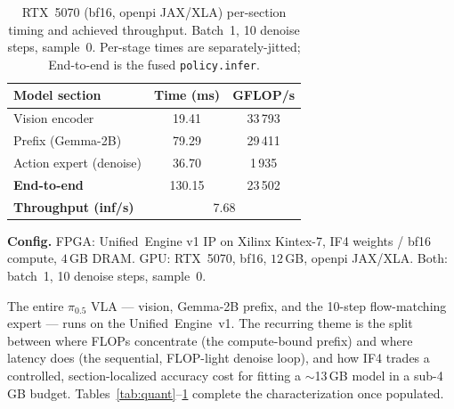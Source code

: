 \documentclass[11pt]{article}
\newcommand{\pizero}{$\pi_{0.5}$}
\newcommand{\ue}{Unified~Engine}
\newcommand{\iffour}{IF4}
\newcommand{\bfteen}{bf16}
\begin{document}
\begin{table}[t]
\centering\small
\caption{RTX~5070 (\bfteen{}, openpi JAX/XLA) per-section timing and achieved
throughput. Batch~1, 10 denoise steps, sample~0. Per-stage times are
separately-jitted; End-to-end is the fused \texttt{policy.infer}.}
\label{tab:timing-gpu}
\begin{tabular}{@{}lcc@{}}
\toprule
\textbf{Model section} & \textbf{Time (ms)} & \textbf{GFLOP/s} \\
\midrule
Vision encoder          & 19.41  & 33\,793 \\
Prefix (Gemma-2B)       & 79.29  & 29\,411 \\
Action expert (denoise) & 36.70  & 1\,935  \\
\midrule
\textbf{End-to-end}     & 130.15 & 23\,502 \\
\textbf{Throughput (inf/s)} & \multicolumn{2}{c}{7.68} \\
\bottomrule
\end{tabular}
\end{table}

\vspace{2pt}
\noindent\textbf{Config.} FPGA: \ue{} v1 IP on Xilinx Kintex-7, \iffour{}
weights / \bfteen{} compute, $4$\,GB DRAM. GPU: RTX~5070, \bfteen{}, $12$\,GB,
openpi JAX/XLA. Both: batch~1, 10 denoise steps, sample~0.

\vspace{4pt}
The entire \pizero{} VLA --- vision, Gemma-2B prefix, and the 10-step
flow-matching expert --- runs on the \ue{}~v1. The recurring theme is the split
between where FLOPs concentrate (the compute-bound prefix) and where latency
does (the sequential, FLOP-light denoise loop), and how \iffour{} trades a
controlled, section-localized accuracy cost for fitting a $\sim$13\,GB model in
a sub-4\,GB budget. Tables~\ref{tab:quant}--\ref{tab:timing-gpu} complete the
characterization once populated.
\end{document}
